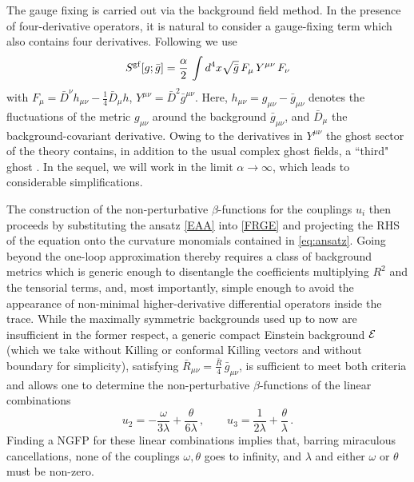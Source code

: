\documentclass[11pt,reqno]{article}
\newcommand{\be}{\begin{equation}}
\newcommand{\ee}{\end{equation}}
\let\a=\alpha \let\b=\beta  \let\g=\gamma  \let\d=\delta
\let\m=\mu    \let\n=\nu    \let\x=\xi      \let\r=\rho \let\om=\omega
\newcommand{\2}{\sqrt{2\,}}
\newcommand{\gb}{\bar{g}}
\newcommand{\Db}{\bar{D}}
\newcommand{\Rb}{\bar{R}}
\begin{document}
The gauge fixing is carried out via the background field method.
In the presence of four-derivative operators, it is natural to consider a gauge-fixing term which also contains four derivatives.
 Following \cite{Codello:2006in} we use
%
\be
S^{\rm gf}[g;\gb] = \frac{\a}{2} \, \int d^4x \sqrt{\gb} \, F_\mu \, Y^{\mu \nu} \, F_\nu 
\ee
%
with $F_\mu = \Db^\nu h_{\mu \nu} - \frac{1}{4} \Db_\mu h $, $ Y^{\mu \nu} = \Db^2 \gb^{\mu \nu} $.
%
Here, $h_{\mu \nu} = g_{\mu \nu} - \gb_{\mu \nu}$ denotes the fluctuations of the metric $g_{\m\n}$ around the background $\gb_{\mu \nu}$, and $\Db_\mu$ 
the background-covariant derivative. 
Owing to the derivatives in $Y^{\mu\nu}$ the ghost sector of the theory contains, in addition to the usual complex ghost fields, a ``third" ghost \cite{Barth:1983hb}.
In the sequel, we will work in the limit $\a \rightarrow \infty$, which leads to considerable simplifications.

The construction of the non-perturbative $\beta$-functions for the couplings $u_i$ then proceeds by substituting the ansatz \eqref{EAA} 
into \eqref{FRGE} and projecting the RHS of the equation onto the curvature monomials contained in \eqref{eq:ansatz}. Going 
beyond the one-loop approximation \cite{Codello:2006in} thereby requires a class of background metrics which is generic enough to disentangle
 the coefficients multiplying $R^2$ and the tensorial terms, and, most importantly, simple enough to avoid the appearance of non-minimal 
higher-derivative differential operators inside the trace. While the maximally symmetric backgrounds used up to now are insufficient in 
the former respect, a generic compact Einstein background ${\cal E}$ (which we take without Killing
 or conformal Killing vectors and without boundary for 
simplicity), satisfying
%
$\Rb_{\m\n}=\tfrac{\Rb}{4} \, \gb_{\m\n}$, 
%
is sufficient to meet both criteria and allows one to determine the non-perturbative $\beta$-functions of the linear combinations
%
\be
u_2 = - \frac{\omega}{3\lambda} + \frac{\theta}{6\lambda} 
\, , \qquad u_3 = \frac{1}{2\lambda} + \frac{\theta}{\lambda} \, .
\ee 
Finding a NGFP for these linear combinations implies that, barring miraculous cancellations, none of the couplings $\omega, \theta$ goes to infinity, and $\lambda$ and either $\omega$ or $\theta$ must be non-zero.
\end{document}
